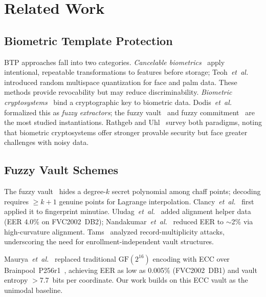 \documentclass[3p,twocolumn]{elsarticle}
\begin{document}
\section{Related Work}
\label{sec:related}

\subsection{Biometric Template Protection}

BTP approaches fall into two categories. \emph{Cancelable biometrics}~\cite{ratha2007generating} apply intentional, repeatable transformations to features before storage; Teoh~\textit{et~al.}~\cite{teoh2004random} introduced random multispace quantization for face and palm data. These methods provide revocability but may reduce discriminability. \emph{Biometric cryptosystems}~\cite{jain2008biometric} bind a cryptographic key to biometric data. Dodis~\textit{et~al.}~\cite{dodis2008fuzzy} formalized this as \emph{fuzzy extractors}; the fuzzy vault~\cite{juels2002fuzzy} and fuzzy commitment~\cite{hao2006combining} are the most studied instantiations. Rathgeb and Uhl~\cite{rathgeb2011survey} survey both paradigms, noting that biometric cryptosystems offer stronger provable security but face greater challenges with noisy data.

\subsection{Fuzzy Vault Schemes}

The fuzzy vault~\cite{juels2002fuzzy} hides a degree-$k$ secret polynomial among chaff points; decoding requires $\geq k{+}1$ genuine points for Lagrange interpolation. Clancy~\textit{et~al.}~\cite{clancy2003secure} first applied it to fingerprint minutiae. Uludag~\textit{et~al.}~\cite{uludag2005fuzzy} added alignment helper data (EER 4.0\% on FVC2002~DB2); Nandakumar~\textit{et~al.}~\cite{nandakumar2007fuzzy} reduced EER to $\sim$2\% via high-curvature alignment. Tams~\cite{tams2013attacks} analyzed record-multiplicity attacks, underscoring the need for enrollment-independent vault structures.

Maurya~\textit{et~al.}~\cite{maurya2025enhancing} replaced traditional $\mathrm{GF}(2^{16})$ encoding with ECC over Brainpool~P256r1~\cite{rfc5639}, achieving EER as low as 0.005\% (FVC2002~DB1) and vault entropy $>$7.7~bits per coordinate. Our work builds on this ECC vault as the unimodal baseline.
\end{document}
